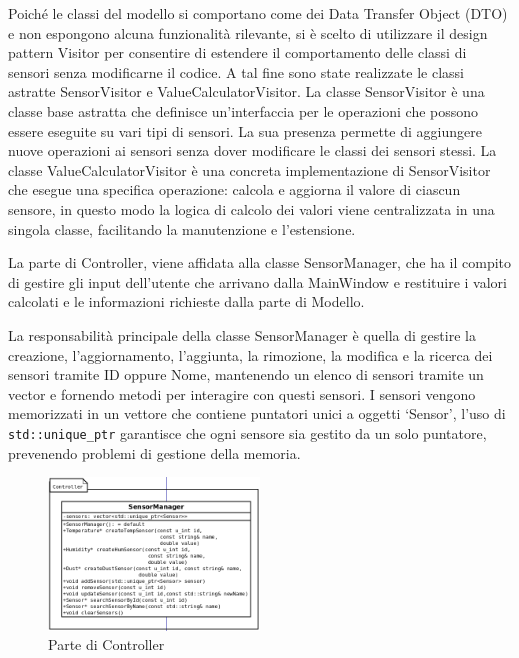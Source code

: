 \documentclass{article}
\begin{document}
Poiché le classi del modello si comportano come dei Data Transfer Object (DTO) e non espongono alcuna funzionalità rilevante, si è scelto di utilizzare il design pattern Visitor per consentire di estendere il comportamento delle classi di sensori senza modificarne il codice. A tal fine sono state realizzate le classi astratte SensorVisitor e ValueCalculatorVisitor. La classe  SensorVisitor è una classe base astratta che definisce un'interfaccia per le operazioni che possono essere eseguite su vari tipi di sensori. La sua presenza permette di aggiungere nuove operazioni ai sensori senza dover modificare le classi dei sensori stessi. La classe ValueCalculatorVisitor è una concreta implementazione di SensorVisitor che esegue una specifica operazione: calcola e aggiorna il valore di ciascun sensore, in questo modo la logica di calcolo dei valori viene centralizzata in una singola classe, facilitando la manutenzione e l’estensione.

La parte di Controller, viene affidata alla classe SensorManager, che ha il compito di gestire gli input dell’utente che arrivano dalla MainWindow e restituire i valori calcolati e le informazioni richieste dalla parte di Modello. 

La responsabilità principale della classe SensorManager è quella di gestire la creazione, l'aggiornamento, l’aggiunta, la rimozione, la modifica e la ricerca dei sensori tramite ID oppure Nome, mantenendo un elenco di sensori tramite un vector e fornendo metodi per interagire con questi sensori. I sensori vengono memorizzati in un vettore che contiene puntatori unici a oggetti ‘Sensor’, l'uso di \verb|std::unique_ptr| garantisce che ogni sensore sia gestito da un solo puntatore, prevenendo problemi di gestione della memoria.

\begin{figure}[h]
    \centering
    \includegraphics[width=0.5\textwidth]{Controller.png}
    \caption{Parte di Controller}
    \label{fig:Parte di Controller}
\end{figure}
\end{document}
